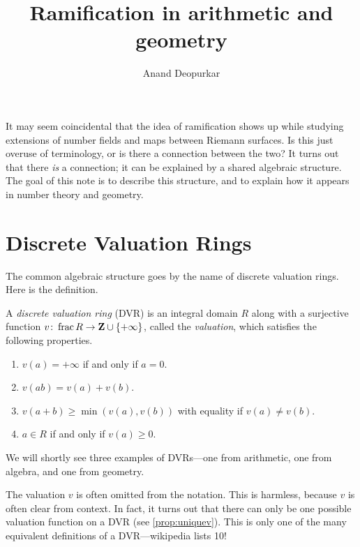 \documentclass[12pt]{article}
\title{Ramification in arithmetic and geometry}
\author{Anand Deopurkar}
\DeclareMathOperator{\f}{frac}
\begin{document}
\maketitle

It may seem coincidental that the idea of ramification shows up while studying extensions of number fields and maps between Riemann surfaces.
Is this just overuse of terminology, or is there a connection between the two?
It turns out that there \emph{is} a connection; it can be explained by a shared algebraic structure.
The goal of this note is to describe this structure, and to explain how it appears in number theory and geometry.

\section{Discrete Valuation Rings}
The common algebraic structure goes by the name of discrete valuation rings.
Here is the definition.
\begin{definition}
  A \emph{discrete valuation ring} (DVR) is an integral domain $R$ along with a surjective function $v \from \f R \to \Z \cup \{+\infty\}$, called the \emph{valuation}, which satisfies the following properties.
  \begin{enumerate}
  \item $v(a) = +\infty$ if and only if $a = 0$.
  \item $v(ab) = v(a) + v(b)$.
  \item $v(a+b) \geq \min(v(a), v(b))$ with equality if $v(a) \neq v(b)$.
  \item $a \in R$ if and only if $v(a) \geq 0$.
  \end{enumerate}
\end{definition}
We will shortly see three examples of DVRs---one from arithmetic, one from algebra, and one from geometry.

The valuation $v$ is often omitted from the notation.
This is harmless, because $v$ is often clear from context.
In fact, it turns out that there can only be one possible valuation function on a DVR (see \autoref{prop:uniquev}).
This is only one of the many equivalent definitions of a DVR---wikipedia lists 10!
\end{document}
